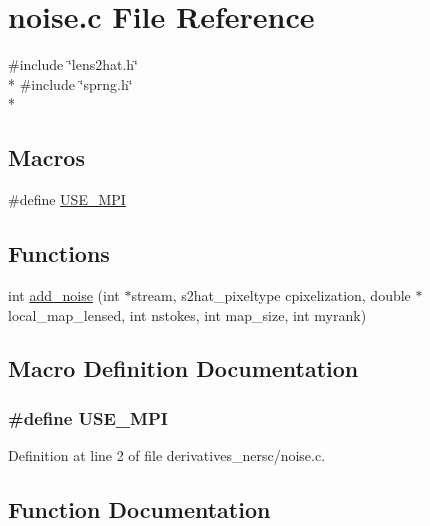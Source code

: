 \section{noise.\-c File Reference}
\label{derivatives__nersc_2noise_8c}
{\ttfamily \#include \char`\"{}lens2hat.\-h\char`\"{}}\\*
{\ttfamily \#include \char`\"{}sprng.\-h\char`\"{}}\\*
\subsection*{Macros}
\begin{DoxyCompactItemize}
\item 
\#define \hyperlink{derivatives__nersc_2noise_8c_a3869d282031f6ea6b50fdb980b758420}{U\-S\-E\-\_\-\-M\-P\-I}
\end{DoxyCompactItemize}
\subsection*{Functions}
\begin{DoxyCompactItemize}
\item 
int \hyperlink{derivatives__nersc_2noise_8c_a3f684122a9649e75f6c303fd20a236a5}{add\-\_\-noise} (int $\ast$stream, s2hat\-\_\-pixeltype cpixelization, double $\ast$local\-\_\-map\-\_\-lensed, int nstokes, int map\-\_\-size, int myrank)
\end{DoxyCompactItemize}


\subsection{Macro Definition Documentation}
\subsubsection[{U\-S\-E\-\_\-\-M\-P\-I}]{\setlength{\rightskip}{0pt plus 5cm}\#define U\-S\-E\-\_\-\-M\-P\-I}\label{derivatives__nersc_2noise_8c_a3869d282031f6ea6b50fdb980b758420}


Definition at line 2 of file derivatives\-\_\-nersc/noise.\-c.



\subsection{Function Documentation}
